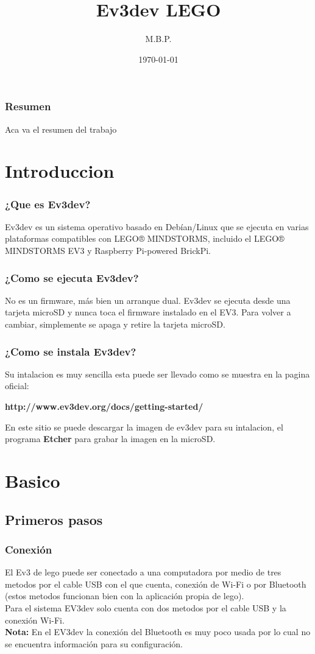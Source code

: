 \documentclass{beamer}
\begin{document}
\title{Ev3dev LEGO}
\author{M.B.P.}
\date{\today}
\maketitle

\newpage
\begin{frame}\frametitle{Resumen}
Aca va el resumen del trabajo
\end{frame}

\newpage
\section{Introduccion}
\begin{frame}\frametitle{¿Que es Ev3dev?} 
Ev3dev es un sistema operativo basado en Debían/Linux que se ejecuta en varias plataformas compatibles con LEGO® MINDSTORMS, incluido el LEGO® MINDSTORMS EV3 y Raspberry Pi-powered BrickPi.
\end{frame}

\newpage
\begin{frame}\frametitle{¿Como se ejecuta Ev3dev?} 
No es un firmware, más bien un arranque dual. Ev3dev se ejecuta desde una tarjeta microSD y nunca toca el firmware instalado en el EV3. Para volver a cambiar, simplemente se apaga y retire la tarjeta microSD.
\end{frame}

\newpage
\begin{frame}\frametitle{¿Como se instala Ev3dev?} 
Su intalacion es muy sencilla esta puede ser llevado como se muestra en la pagina oficial:

\begin{center}
\textbf{http://www.ev3dev.org/docs/getting-started/}
\end{center}
En este sitio se puede descargar la imagen de ev3dev para su intalacion, el programa \textbf{Etcher} para grabar la imagen en la microSD.
\end{frame}

\newpage
\section{Basico}
\subsection{Primeros pasos}
\begin{frame}\frametitle{Conexión}
El Ev3 de lego puede ser conectado a una computadora por medio de tres metodos por el cable USB con el que cuenta, conexión de Wi-Fi o por Bluetooth (estos metodos funcionan bien con la aplicación propia de lego).\\ \vspace{5mm}
Para el sistema EV3dev solo cuenta con dos metodos por el cable USB y la conexión Wi-Fi.\\ \vspace{5mm}
\textbf{Nota:} En el EV3dev la conexión del Bluetooth es muy poco usada por lo cual no se encuentra información para su configuración.
\end{frame}
\end{document}
